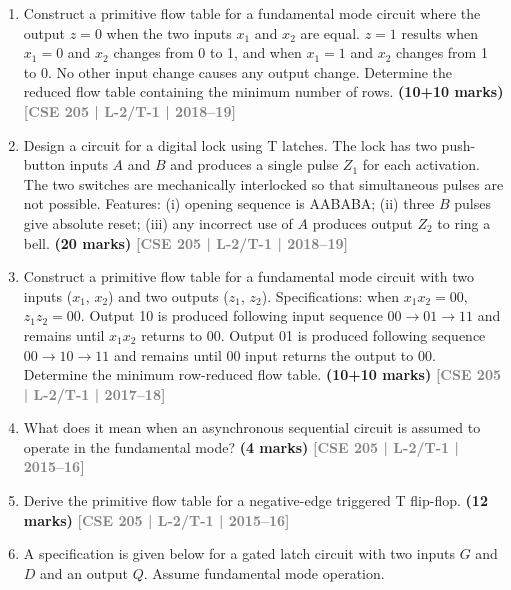 \documentclass[12pt,a3paper]{article}
\newcommand{\yr}[1]{\hfill\textcolor{gray}{\small\textbf{[#1]}}}
\newcommand{\mk}[1]{\textcolor{orange!70!black}{\small\textbf{(#1 marks)}}}
\begin{document}
\begin{enumerate}
\item Construct a primitive flow table for a fundamental mode circuit where the output $z=0$ when the two inputs $x_1$ and $x_2$ are equal. $z=1$ results when $x_1=0$ and $x_2$ changes from 0 to 1, and when $x_1=1$ and $x_2$ changes from 1 to 0. No other input change causes any output change. Determine the reduced flow table containing the minimum number of rows.
\mk{10+10} \yr{CSE 205 | L-2/T-1 | 2018--19}

\item Design a circuit for a digital lock using T latches. The lock has two push-button inputs $A$ and $B$ and produces a single pulse $Z_1$ for each activation. The two switches are mechanically interlocked so that simultaneous pulses are not possible. Features: (i) opening sequence is AABABA; (ii) three $B$ pulses give absolute reset; (iii) any incorrect use of $A$ produces output $Z_2$ to ring a bell.
\mk{20} \yr{CSE 205 | L-2/T-1 | 2018--19}

\item Construct a primitive flow table for a fundamental mode circuit with two inputs ($x_1$, $x_2$) and two outputs ($z_1$, $z_2$). Specifications: when $x_1x_2=00$, $z_1z_2=00$. Output 10 is produced following input sequence $00\to01\to11$ and remains until $x_1x_2$ returns to 00. Output 01 is produced following sequence $00\to10\to11$ and remains until 00 input returns the output to 00. Determine the minimum row-reduced flow table.
\mk{10+10} \yr{CSE 205 | L-2/T-1 | 2017--18}

\item What does it mean when an asynchronous sequential circuit is assumed to operate in the fundamental mode?
\mk{4} \yr{CSE 205 | L-2/T-1 | 2015--16}

\item Derive the primitive flow table for a negative-edge triggered T flip-flop.
\mk{12} \yr{CSE 205 | L-2/T-1 | 2015--16}


\item A specification is given below for a gated latch circuit with two inputs $G$ and $D$ and an output $Q$. Assume fundamental mode operation.


\end{enumerate}
\end{document}
